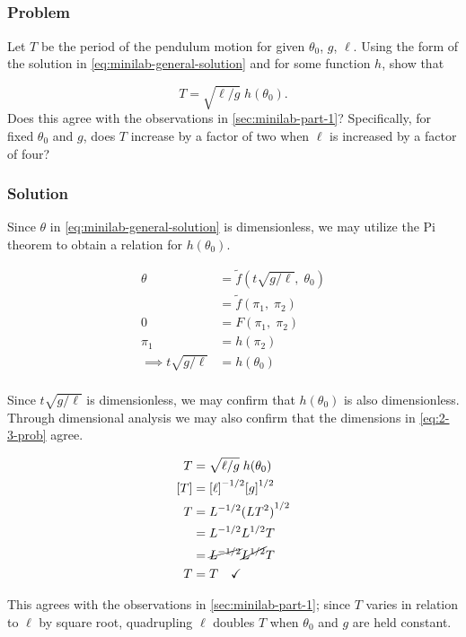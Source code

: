\documentclass[12pt]{article}
\begin{document}
\subsection{}
  \subsubsection*{Problem}
  Let $T$ be the period of the pendulum motion for given $\theta_0$, $g$,
  $\ell$. Using the form of the solution in \cref{eq:minilab-general-solution}
  and for some function $h$, show that

  \begin{equation}
    \label{eq:2-3-prob}
    T=\sqrt{\ell/g}\;h(\theta_0).
  \end{equation}
  Does this agree with the observations in \cref{sec:minilab-part-1}?
  Specifically, for fixed $\theta_0$ and $g$, does $T$ increase by a factor of
  two when $\ell$ is increased by a factor of four?

  \subsubsection*{Solution}

  Since $\theta$ in \cref{eq:minilab-general-solution} is dimensionless, we may
  utilize the Pi theorem to obtain a relation for $h(\theta_0)$.

  \begin{equation}
    \begin{aligned}
      \theta &= \tilde{f}(t\sqrt{g/\ell},\;\theta_0) \\
      &= \tilde{f}(\pi_1,\;\pi_2) \\
      0 &= F(\pi_1,\;\pi_2) \\
      \pi_1 &= h(\pi_2) \\
      \implies t\sqrt{g/\ell} &= h(\theta_0) \\
    \end{aligned}
  \end{equation}

  Since $t\sqrt{g/\ell}$ is dimensionless, we may confirm that $h(\theta_0)$ is
  also dimensionless. Through dimensional analysis we may also confirm that the
  dimensions in \cref{eq:2-3-prob} agree.

  \begin{equation}
    \begin{aligned}
      T &= \sqrt{\ell/g}\;h(\theta_0) \\
      [T] &= {[\ell]}^{-1/2}{[g]}^{1/2} \\
      T &= L^{-1/2}{(LT^2)}^{1/2} \\
      &= L^{-1/2}L^{1/2}T \\
      &= \cancel{L^{-1/2}}\cancel{L^{1/2}}T \\
      T &= T \quad\checkmark
    \end{aligned}
  \end{equation}

  This agrees with the observations in \cref{sec:minilab-part-1}; since $T$
  varies in relation to $\ell$ by square root, quadrupling $\ell$ doubles $T$
  when $\theta_0$ and $g$ are held constant.
\end{document}
